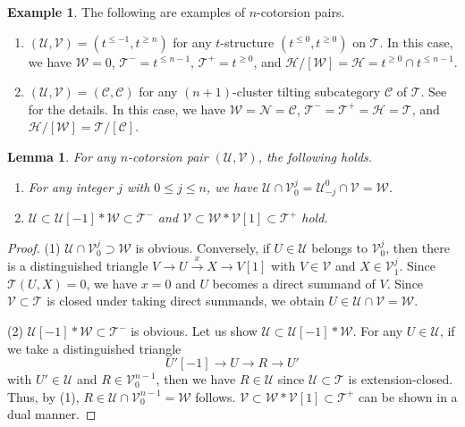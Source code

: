 \documentclass[a4paper,reqno,10pt]{amsart}
\newtheorem{lemma}[lemma]{Lemma}
\theoremstyle{definition}
\theoremstyle{definition}
\theoremstyle{definition}
\theoremstyle{definition}
\newtheorem{example}[example]{Example}
\theoremstyle{plain}
\newcommand{\CC}{\mathcal{C}}
\newcommand{\CH}{\mathcal{H}}
\newcommand{\CN}{\mathcal{N}}
\newcommand{\CT}{\mathcal{T}}
\newcommand{\CU}{\mathcal{U}}
\newcommand{\CV}{\mathcal{V}}
\newcommand{\CW}{\mathcal{W}}
\begin{document}
\begin{example}\label{ex:t_structure_n_cotorsion_pair}
The following are examples of $n$-cotorsion pairs.
\begin{enumerate}
\item $(\CU,\CV)=(t^{\le-1},t^{\ge n})$ for any $t$-structure $(t^{\le0},t^{\ge0})$ on $\CT$. In this case, we have $\CW=0$, $\CT^-=t^{\le n-1}$, $\CT^+=t^{\ge 0}$, and $\CH/[\CW]=\CH=t^{\ge 0}\cap t^{\le n-1}$. 
\item $(\CU,\CV)=(\CC,\CC)$ for any $(n+1)$-cluster tilting subcategory $\CC$ of $\CT$. See \cite[Theorem~3.1]{HZ22} for the details. In this case, we have $\CW=\CN=\CC$, $\CT^-=\CT^+=\CH=\CT$, and $\CH/[\CW]=\CT/[\CC]$. 
\end{enumerate}
\end{example}




\begin{lemma}\label{lem:inclusions_for_n-CT}
For any $n$-cotorsion pair $(\CU,\CV)$, the following holds.
\begin{enumerate}
\item For any integer $j$ with $0\le j\le n$, we have $\CU\cap\CV_0^j=\CU_{-j}^0\cap\CV=\CW$.
\item $\CU\subset\CU[-1]\ast\CW\subset\CT^-$ and $\CV\subset\CW\ast\CV[1]\subset\CT^+$ hold. 
\end{enumerate}
\end{lemma}
\begin{proof}
{\rm (1)} $\CU\cap\CV_0^j\supset\CW$ is obvious. Conversely, if $U\in\CU$ belongs to $\CV_0^j$, then there is a distinguished triangle $V\to U\xrightarrow{x}X\to V[1]$ with $V\in\CV$ and $X\in\CV_1^j$. Since $\CT(U,X)=0$, we have $x=0$ and $U$ becomes a direct summand of $V$. Since $\CV\subset\CT$ is closed under taking direct summands, we obtain $U\in\CU\cap\CV=\CW$.

{\rm (2)} $\CU[-1]\ast\CW\subset\CT^-$ is obvious. Let us show $\CU\subset\CU[-1]\ast\CW$. For any $U\in\CU$, if we take a distinguished triangle
\[
U'[-1]\to U\to R\to U'
\]
with $U'\in\CU$ and $R\in\CV_0^{n-1}$, then we have $R\in\CU$ since $\CU\subset\CT$ is extension-closed. Thus, by {\rm (1)}, $R\in\CU\cap\CV_0^{n-1}=\CW$ follows. 
$\CV\subset\CW\ast\CV[1]\subset\CT^+$ can be shown in a dual manner.
\end{proof}
\end{document}

